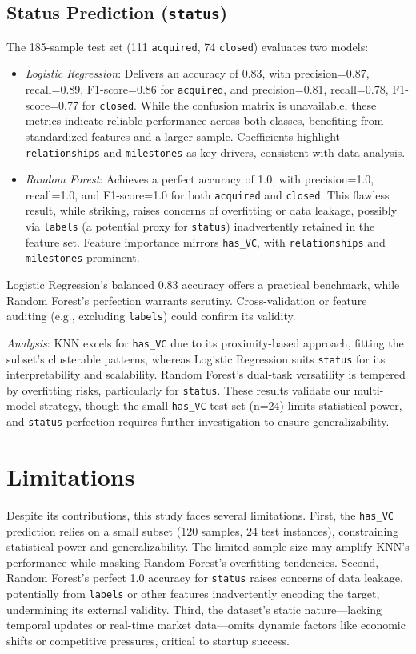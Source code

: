 \documentclass[conference]{IEEEtran}
\begin{document}
    \subsection{Status Prediction (\texttt{status})}
    The 185-sample test set (111 \texttt{acquired}, 74 \texttt{closed}) evaluates two models:
    \begin{itemize}
        \item \textit{Logistic Regression}: Delivers an accuracy of 0.83, with precision=0.87, recall=0.89, F1-score=0.86 for \texttt{acquired}, and precision=0.81, recall=0.78, F1-score=0.77 for \texttt{closed}. While the confusion matrix is unavailable, these metrics indicate reliable performance across both classes, benefiting from standardized features and a larger sample. Coefficients highlight \texttt{relationships} and \texttt{milestones} as key drivers, consistent with data analysis.
        \item \textit{Random Forest}: Achieves a perfect accuracy of 1.0, with precision=1.0, recall=1.0, and F1-score=1.0 for both \texttt{acquired} and \texttt{closed}. This flawless result, while striking, raises concerns of overfitting or data leakage, possibly via \texttt{labels} (a potential proxy for \texttt{status}) inadvertently retained in the feature set. Feature importance mirrors \texttt{has\_VC}, with \texttt{relationships} and \texttt{milestones} prominent.
    \end{itemize}
    Logistic Regression’s balanced 0.83 accuracy offers a practical benchmark, while Random Forest’s perfection warrants scrutiny. Cross-validation or feature auditing (e.g., excluding \texttt{labels}) could confirm its validity.

    \textit{Analysis}: KNN excels for \texttt{has\_VC} due to its proximity-based approach, fitting the subset’s clusterable patterns, whereas Logistic Regression suits \texttt{status} for its interpretability and scalability. Random Forest’s dual-task versatility is tempered by overfitting risks, particularly for \texttt{status}. These results validate our multi-model strategy, though the small \texttt{has\_VC} test set (n=24) limits statistical power, and \texttt{status} perfection requires further investigation to ensure generalizability.


\section{Limitations}
    Despite its contributions, this study faces several limitations. First, the \texttt{has\_VC} prediction relies on a small subset (120 samples, 24 test instances), constraining statistical power and generalizability. The limited sample size may amplify KNN’s performance while masking Random Forest’s overfitting tendencies. Second, Random Forest’s perfect 1.0 accuracy for \texttt{status} raises concerns of data leakage, potentially from \texttt{labels} or other features inadvertently encoding the target, undermining its external validity. Third, the dataset’s static nature—lacking temporal updates or real-time market data—omits dynamic factors like economic shifts or competitive pressures, critical to startup success.
\end{document}
